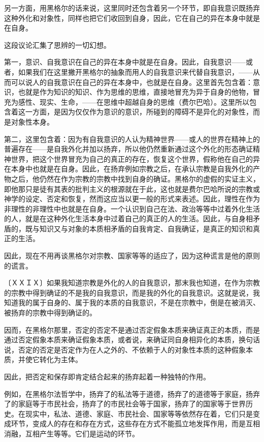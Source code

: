 \documentclass[a4paper,twoside,12pt]{ctexart}
\begin{document}
另一方面，用黑格尔的话来说，这里同时还包含着另一个环节，即自我意识既扬弃这种外化和对象性，同样也把它们收回到自身，因此，它在自己的异在本身中就是在自身。

这段议论汇集了思辨的一切幻想。

第一，意识、自我意识在自己的异在本身中就是在自身。因此，自我意识——或者，如果我们在这里撇开黑格尔的抽象而用人的自我意识来代替自我意识，——从而可以说人的自我意识在自己的异在本身中，也就是在自身。这里首先包含着：意识，也就是作为知识的知识、作为思维的思维，直接地冒充为异于自身的他物，冒充为感性、现实、生命，——在思维中超越自身的思维（费尔巴哈）。这里所以包含着这一方面，是因为仅仅作为意识的意识，所碰到的障碍不是异化的对象性，而是对象性本身。

第二，这里包含着：因为有自我意识的人认为精神世界——或人的世界在精神上的普遍存在——是自我外化并加以扬弃，所以他仍然重新通过这个外化的形态确证精神世界，把这个世界冒充为自己的真正的存在，恢复这个世界，假称他在自己的异在本身中也就是在自身。因此，在扬弃例如宗教之后，在承认宗教是自我外化的产物之后，他仍然在作为宗教的宗教中找到自身的确证。黑格尔的虚假的实证主义，即他那只是徒有其表的批判主义的根源就在于此，这也就是费尔巴哈所说的宗教或神学的设定、否定和恢复，然而这应当以更一般的形式来表述。因此，理性在作为非理性的非理性中也就是在自身。一个认识到自己在法、政治等等中过着外化生活的人，就是在这种外化生活本身中过着自己的真正的人的生活。因此，与自身相矛盾的，既与知识又与对象的本质相矛盾的自我肯定、自我确证，是真正的知识和真正的生活。

因此，现在不用再谈黑格尔对宗教、国家等等的适应了，因为这种谎言是他的原则的谎言。

〔ＸＸＩＸ〕如果我知道宗教是外化的人的自我意识，那末我也知道，在作为宗教的宗教中得到确证的不是我的自我意识，而是我的外化的自我意识。这就是说，我知道我的属于自身的、属于我的本质的自我意识，不是在宗教中，倒是在被消灭、被扬弃的宗教中得到确证的。

因而，在黑格尔那里，否定的否定不是通过否定假象本质来确证真正的本质，而是通过否定假象本质来确证假象本质，或者说，来确证同自身相异化的本质，换句话说，否定的否定是否定作为在人之外的、不依赖于人的对象性本质的这种假象本质，并使它转化为主体。

因此，把否定和保存即肯定结合起来的扬弃起着一种独特的作用。

例如，在黑格尔法哲学中，扬弃了的私法等于道德，扬弃了的道德等于家庭，扬弃了的家庭等于市民社会，扬弃了的市民社会等于国家，扬弃了的国家等于世界历史。在现实中，私法、道德、家庭、市民社会、国家等等依然存在着，它们只是变成环节，变成人的存在和存在方式，这些存在方式不能孤立地发挥作用，而是互相消融，互相产生等等。它们是运动的环节。
\end{document}
